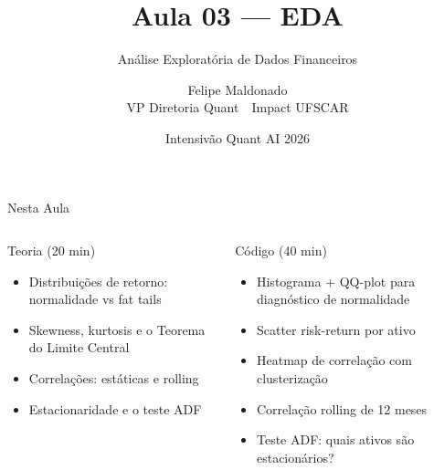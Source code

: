 \documentclass[aspectratio=169,12pt]{beamer}
\author{Felipe Maldonado\\{\scriptsize VP Diretoria Quant~\textbullet{}~Impact UFSCAR}}
\date{Intensivão Quant AI 2026}
\title{Aula 03 --- EDA}
\subtitle{Análise Exploratória de Dados Financeiros}
\begin{document}
\begin{frame}[plain]
\titlepage
\end{frame}

\begin{frame}[fragile]{Nesta Aula}
\begin{columns}[T]
\begin{block}{Teoria (20 min)}
\begin{itemize}
  \item Distribuições de retorno: normalidade vs fat tails
  \item Skewness, kurtosis e o Teorema do Limite Central
  \item Correlações: estáticas e rolling
  \item Estacionaridade e o teste ADF
\end{itemize}
\end{block}
\begin{block}{Código (40 min)}
\begin{itemize}
  \item Histograma + QQ-plot para diagnóstico de normalidade
  \item Scatter risk-return por ativo
  \item Heatmap de correlação com clusterização
  \item Correlação rolling de 12 meses
  \item Teste ADF: quais ativos são estacionários?
\end{itemize}
\end{block}
\end{columns}
\end{frame}
\end{document}
